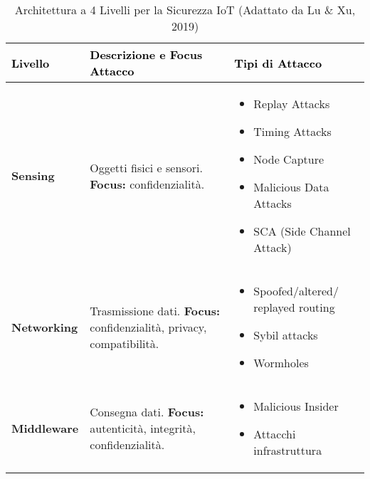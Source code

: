\begin{table}[H]
\centering
\caption{Architettura a 4 Livelli per la Sicurezza IoT (Adattato da Lu \& Xu, 2019)}
\label{tab:iot_architecture}
\begin{tabular}{|p{}|p{}|p{}|}
\hline
\rowcolor{bg_custom}
\textcolor{black}{\textbf{Livello}} & \textcolor{black}{\textbf{Descrizione e Focus Attacco}} & \textcolor{black}{\textbf{Tipi di Attacco}} \\
\hline
\textbf{Sensing} & Oggetti fisici e sensori. \newline \textbf{Focus:} confidenzialità. &
    \begin{itemize}[nosep, leftmargin=*, itemsep=-2pt, before=\vspace{-0.5\baselineskip}, after=\vspace{-\baselineskip}]
        \item Replay Attacks
        \item Timing Attacks
        \item Node Capture
        \item Malicious Data Attacks
        \item SCA (Side Channel Attack)
    \end{itemize} \\
\hline
\textbf{Networking} & Trasmissione dati. \newline \textbf{Focus:} confidenzialità, privacy, compatibilità. &
    \begin{itemize}[nosep, leftmargin=*, itemsep=-2pt, before=\vspace{-0.5\baselineskip}, after=\vspace{-\baselineskip}]
        \item Spoofed/altered/ replayed routing
        \item Sybil attacks
        \item Wormholes
    \end{itemize} \\
\hline
\textbf{Middleware} & Consegna dati. \newline \textbf{Focus:} autenticità, integrità, confidenzialità. &
    \begin{itemize}[nosep, leftmargin=*, itemsep=-2pt, before=\vspace{-0.5\baselineskip}, after=\vspace{-\baselineskip}]
        \item Malicious Insider
        \item Attacchi infrastruttura

\end{itemize}
\end{tabular}
\end{table}
